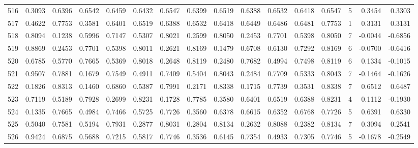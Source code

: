 \begin{tabular}{lrrrrrrrrrrrrrrr}
516 &      0.3093 &  0.6396 &  0.6542 &  0.6459 &  0.6432 &  0.6547 &  0.6399 &  0.6519 &  0.6388 &  0.6532 &   0.6418 &     0.6547 &      5 &                    0.3454 &                     0.3303 \\
517 &      0.4622 &  0.7753 &  0.3581 &  0.6401 &  0.6519 &  0.6388 &  0.6532 &  0.6418 &  0.6449 &  0.6486 &   0.6481 &     0.7753 &      1 &                    0.3131 &                     0.3131 \\
518 &      0.8094 &  0.1238 &  0.5996 &  0.7147 &  0.5307 &  0.8021 &  0.2599 &  0.8050 &  0.2453 &  0.7701 &   0.5398 &     0.8050 &      7 &                   -0.0044 &                    -0.6856 \\
519 &      0.8869 &  0.2453 &  0.7701 &  0.5398 &  0.8011 &  0.2621 &  0.8169 &  0.1479 &  0.6708 &  0.6130 &   0.7292 &     0.8169 &      6 &                   -0.0700 &                    -0.6416 \\
520 &      0.6785 &  0.5770 &  0.7665 &  0.5369 &  0.8018 &  0.2648 &  0.8119 &  0.2480 &  0.7682 &  0.4994 &   0.7498 &     0.8119 &      6 &                    0.1334 &                    -0.1015 \\
521 &      0.9507 &  0.7881 &  0.1679 &  0.7549 &  0.4911 &  0.7409 &  0.5404 &  0.8043 &  0.2484 &  0.7709 &   0.5333 &     0.8043 &      7 &                   -0.1464 &                    -0.1626 \\
522 &      0.1826 &  0.8313 &  0.1460 &  0.6860 &  0.5387 &  0.7991 &  0.2171 &  0.8338 &  0.1715 &  0.7739 &   0.3531 &     0.8338 &      7 &                    0.6512 &                     0.6487 \\
523 &      0.7119 &  0.5189 &  0.7928 &  0.2699 &  0.8231 &  0.1728 &  0.7785 &  0.3580 &  0.6401 &  0.6519 &   0.6388 &     0.8231 &      4 &                    0.1112 &                    -0.1930 \\
524 &      0.1335 &  0.7665 &  0.4984 &  0.7466 &  0.5725 &  0.7726 &  0.3560 &  0.6378 &  0.6615 &  0.6352 &   0.6768 &     0.7726 &      5 &                    0.6391 &                     0.6330 \\
525 &      0.5040 &  0.7581 &  0.5194 &  0.7931 &  0.2877 &  0.8031 &  0.2804 &  0.8134 &  0.2632 &  0.8088 &   0.2382 &     0.8134 &      7 &                    0.3094 &                     0.2541 \\
526 &      0.9424 &  0.6875 &  0.5688 &  0.7215 &  0.5817 &  0.7746 &  0.3536 &  0.6145 &  0.7354 &  0.4933 &   0.7305 &     0.7746 &      5 &                   -0.1678 &                    -0.2549 \\

\end{tabular}
